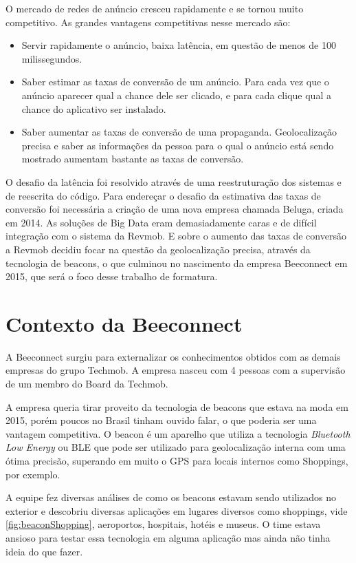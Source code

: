 O mercado de redes de anúncio cresceu rapidamente e se tornou muito competitivo. As grandes vantagens competitivas nesse mercado são:
\begin{itemize}
\item Servir rapidamente o anúncio, baixa latência, em questão de menos de 100 milissegundos.
\item Saber estimar as taxas de conversão de um anúncio. Para cada vez que o anúncio aparecer qual a chance dele ser clicado, e para cada clique qual a chance do aplicativo ser instalado.
\item Saber aumentar as taxas de conversão de uma propaganda. Geolocalização precisa e saber as informações da pessoa para o qual o anúncio está sendo mostrado aumentam bastante as taxas de conversão.
\end{itemize}

O desafio da latência foi resolvido através de uma reestruturação dos sistemas e de reescrita do código. Para endereçar o desafio da estimativa das taxas de conversão foi necessária a criação de uma nova empresa chamada Beluga, criada em 2014. As soluções de Big Data eram demasiadamente caras e de difícil integração com o sistema da Revmob. E sobre o aumento das taxas de conversão a Revmob decidiu focar na questão da geolocalização precisa, através da tecnologia de beacons, o que culminou no nascimento da empresa Beeconnect em 2015, que será o foco desse trabalho de formatura.

\section{Contexto da Beeconnect}
\label{cha:contexto_da_beeconnect}
A Beeconnect surgiu para externalizar os conhecimentos obtidos com as demais empresas do grupo Techmob. A empresa nasceu com 4 pessoas com a supervisão de um membro do Board da Techmob.

A empresa queria tirar proveito da tecnologia de beacons que estava na moda em 2015, porém poucos no Brasil tinham ouvido falar, o que poderia ser uma vantagem competitiva. O beacon é um aparelho que utiliza a tecnologia \textit{Bluetooth Low Energy} ou BLE que pode ser utilizado para geolocalização interna com uma ótima precisão, superando em muito o GPS para locais internos como Shoppings, por exemplo.

A equipe fez diversas análises de como os beacons estavam sendo utilizados no exterior e descobriu diversas aplicações em lugares diversos como shoppings, vide \autoref{fig:beaconShopping}, aeroportos, hospitais, hotéis e museus. O time estava ansioso para testar essa tecnologia em alguma aplicação mas ainda não tinha ideia do que fazer.

